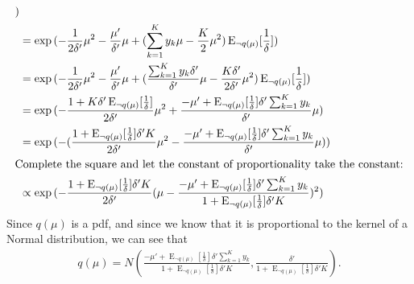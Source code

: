 \documentclass[12pt]{article}
\newcommand{\E}{\operatorname{E}}
\begin{document}
\begin{align}
{    )}
    \nonumber \\
    &= \exp{(-\frac{1}{2\delta'}\mu^2 - \frac{\mu'}{\delta'}\mu
        + (\sum_{k=1}^{K}y_{k}\mu - \frac{K}{2}\mu^2)\E_{\neg q(\mu)}[\frac{1}{\delta}]
    )}
    \nonumber \\
    &= \exp{(-\frac{1}{2\delta'}\mu^2 - \frac{\mu'}{\delta'}\mu
        + (\frac{\sum_{k=1}^{K}y_{k}\delta'}{\delta'}\mu
        - \frac{K\delta'}{2\delta'}\mu^2)\E_{\neg q(\mu)}[\frac{1}{\delta}]
    )}
    \nonumber \\
    &= \exp{(-\frac{1+K\delta'\E_{\neg q(\mu)}[\frac{1}{\delta}]}{2\delta'}\mu^2
    + \frac{-\mu' + \E_{\neg q(\mu)}[\frac{1}{\delta}]\delta'\sum_{k=1}^{K}y_{k}}{\delta'}\mu
    )}
    \nonumber \\
    &= \exp{(-(\frac{1+\E_{\neg q(\mu)}[\frac{1}{\delta}]\delta'K}{2\delta'}\mu^2
    - \frac{-\mu' + \E_{\neg q(\mu)}[\frac{1}{\delta}]\delta'\sum_{k=1}^{K}y_{k}}{\delta'}\mu
    ))}
    \nonumber \\
    \intertext{Complete the square and let the constant of proportionality take
    the constant:}
    &\propto
    \exp{(-\frac{1+\E_{\neg q(\mu)}[\frac{1}{\delta}]\delta'K}{2\delta'}
    (\mu
    - \frac{
    -\mu' + \E_{\neg q(\mu)}[\frac{1}{\delta}]\delta'\sum_{k=1}^{K}y_{k}}
    {1 + \E_{\neg q(\mu)}[\frac{1}{\delta}]\delta'K})^2
    )}
\end{align}
Since $q(\mu)$ is a pdf, and since we know that it is proportional to the kernel
of a Normal distribution, we can see that
\begin{align}\label{eq:qmu}
    q(\mu) = N\left(\frac{-\mu' + \E_{\neg q(\mu)}[\frac{1}{\delta}] \delta' \sum_{k=1}^{K}
    y_{k}}{1 + \E_{\neg q(\mu)}[\frac{1}{\delta}]\delta'K}, \frac{\delta'}{1 + \E_{\neg
    q(\mu)}[\frac{1}{\delta}]\delta'K}\right).
\end{align}
\end{document}

